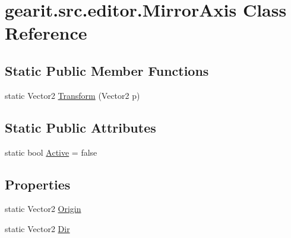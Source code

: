 \hypertarget{classgearit_1_1src_1_1editor_1_1_mirror_axis}{\section{gearit.\+src.\+editor.\+Mirror\+Axis Class Reference}
\label{classgearit_1_1src_1_1editor_1_1_mirror_axis}
}
\subsection*{Static Public Member Functions}
\begin{DoxyCompactItemize}
\item 
static Vector2 \hyperlink{classgearit_1_1src_1_1editor_1_1_mirror_axis_a08d56ab57be963661348503d79435750}{Transform} (Vector2 p)
\end{DoxyCompactItemize}
\subsection*{Static Public Attributes}
\begin{DoxyCompactItemize}
\item 
static bool \hyperlink{classgearit_1_1src_1_1editor_1_1_mirror_axis_a2bae7cd516923dcb03d0730a49774045}{Active} = false
\end{DoxyCompactItemize}
\subsection*{Properties}
\begin{DoxyCompactItemize}
\item 
static Vector2 \hyperlink{classgearit_1_1src_1_1editor_1_1_mirror_axis_a8db69309b20550d60ffd191e3b097dec}{Origin}
\item 
static Vector2 \hyperlink{classgearit_1_1src_1_1editor_1_1_mirror_axis_a44b7cd25add064c30544d98d7a766659}{Dir}
\end{DoxyCompactItemize}


